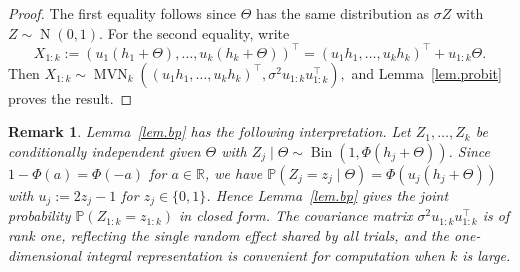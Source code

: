 \documentclass[11pt,authoryear]{elsarticle}
\def\Real{\mathbb{R}}
\def\P#1{{\mathbb{P}}\left(#1\right)}
\newtheorem{remark}{Remark}
\numberwithin{equation}{section}
\begin{document}
\begin{proof}
The first equality follows since \(\Theta\) has the same distribution
as \(\sigma Z\) with \(Z\sim\operatorname{N}(0,1)\). For the second equality, write
\[
X_{1:k}
:=
\left(u_1(h_1+\Theta),\ldots,u_k(h_k+\Theta)\right)^\top
=
(u_1h_1,\ldots,u_kh_k)^\top+u_{1:k}\Theta.
\]
Then
\(
X_{1:k}\sim\operatorname{MVN}_k\left(
(u_1h_1,\ldots,u_kh_k)^\top,\sigma^2u_{1:k}u_{1:k}^\top
\right),
\)
and Lemma~\ref{lem.probit} proves the result.
\end{proof}

\begin{remark}\label{rem.bp}
Lemma~\ref{lem.bp} has the following interpretation. Let
\(Z_1,\ldots,Z_k\) be conditionally independent given \(\Theta\) with
\(Z_j\mid\Theta\sim\operatorname{Bin}\left(1,\Phi(h_j+\Theta)\right)\).
Since \(1-\Phi(a)=\Phi(-a)\) for \(a\in\Real\), we have
\(
\P{Z_j=z_j\mid\Theta}=\Phi\left(u_j(h_j+\Theta)\right)
\)
with \(u_j:=2z_j-1\) for \(z_j\in\{0,1\}\). Hence
Lemma~\ref{lem.bp} gives the joint probability
\(\P{Z_{1:k}=z_{1:k}}\) in closed form. The covariance matrix
\(\sigma^2u_{1:k}u_{1:k}^\top\) is of rank one, reflecting the single
random effect shared by all trials, and the one-dimensional integral
representation is convenient for computation when \(k\) is large.
\end{remark}









%
%
\end{document}
